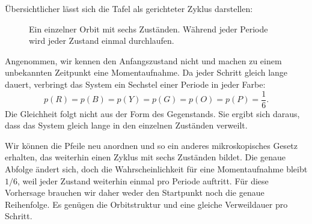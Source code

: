 Übersichtlicher lässt sich die Tafel als gerichteter Zyklus darstellen:
\begin{figure}[htbp]\centering
{}\caption{Ein einzelner Orbit mit sechs Zuständen. Während jeder Periode wird jeder Zustand einmal durchlaufen.}\label{fig:sm1-six-cycle}\end{figure}

Angenommen, wir kennen den Anfangszustand nicht und machen zu einem unbekannten Zeitpunkt eine Momentaufnahme. Da jeder Schritt gleich lange dauert, verbringt das System ein Sechstel einer Periode in jeder Farbe:
\begin{equation}
 p(R)=p(B)=p(Y)=p(G)=p(O)=p(P)=\frac16.
 \label{eq:sm1-uniform-cycle}
\end{equation}
Die Gleichheit folgt nicht aus der Form des Gegenstands. Sie ergibt sich daraus, dass das System gleich lange in den einzelnen Zuständen verweilt.

Wir können die Pfeile neu anordnen und so ein anderes mikroskopisches Gesetz erhalten, das weiterhin einen Zyklus mit sechs Zuständen bildet. Die genaue Abfolge ändert sich, doch die Wahrscheinlichkeit für eine Momentaufnahme bleibt \(1/6\), weil jeder Zustand weiterhin einmal pro Periode auftritt. Für diese Vorhersage brauchen wir daher weder den Startpunkt noch die genaue Reihenfolge. Es genügen die Orbitstruktur und eine gleiche Verweildauer pro Schritt.

\begin{classroomqa}\end{classroomqa}

